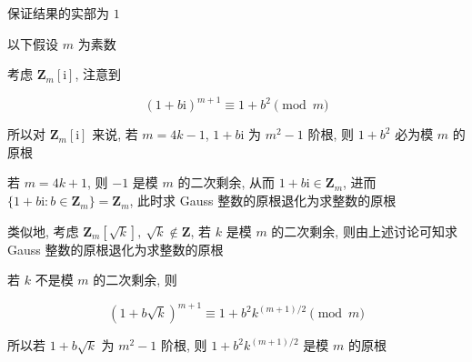 保证结果的实部为 \(1\)

以下假设 \(m\) 为素数

考虑 \(\mathbf{Z}_m[\mathrm{i}]\), 注意到

\[
    \left(1+b\mathrm{i}\right)^{m+1}\equiv 1+b^2 \pmod m
\]

所以对 \(\mathbf{Z}_m[\mathrm{i}]\) 来说, 若 \(m=4k-1\), \(1+b\mathrm{i}\) 为 \(m^2-1\) 阶根, 则 \(1+b^2\) 必为模 \(m\) 的原根

若 \(m=4k+1\), 则 \(-1\) 是模 \(m\) 的二次剩余, 从而 \(1+b\mathrm{i}\in\mathbf{Z}_m\), 进而 \(\{1+b\mathrm{i}:b\in \mathbf{Z}_m\}=\mathbf{Z}_m\), 此时求 Gauss 整数的原根退化为求整数的原根

类似地, 考虑 \(\mathbf{Z}_m\left[\sqrt{k}\right],~\sqrt{k}\notin \mathbf{Z}\), 若 \(k\) 是模 \(m\) 的二次剩余, 则由上述讨论可知求 Gauss 整数的原根退化为求整数的原根

若 \(k\) 不是模 \(m\) 的二次剩余, 则

\[
    \left(1+b\sqrt{k}\right)^{m+1}\equiv 1+b^2 k^{(m+1)/2} \pmod m
\]

所以若 \(1+b\sqrt{k}\) 为 \(m^2-1\) 阶根, 则 \(1+b^2 k^{(m+1)/2}\) 是模 \(m\) 的原根

